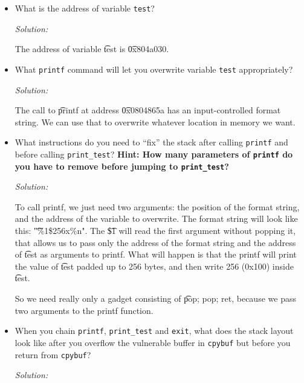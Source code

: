 \documentclass[a4paper,11pt]{article}
\newenvironment{solution}%
{\par{\noindent\small\textit{Solution:}}\vspace{-1ex}\begin{framed}}%
{\end{framed}\par}
\begin{document}
\begin{itemize}
  \item What is the address of variable \texttt{test}?

  \ifsolution
  \begin{solution}
	  The address of variable \t{test} is \t{0x804a030}.
\end{solution}
  \fi

  \item What \texttt{printf} command will let you overwrite variable
  \texttt{test} appropriately?
  
  \ifsolution
  \begin{solution}
	  The call to \t{printf} at address \t{0x0804865a} has an input-controlled format string.
	  We can use that to overwrite whatever location in memory we want.
\end{solution}
  \fi

  \item What instructions do you need to ``fix'' the stack after calling
  \texttt{printf} and before calling \texttt{print\_test}? \textbf{Hint: How
  many parameters of \texttt{printf} do you have to remove before jumping to
  \texttt{print\_test}?}
  
  \ifsolution
  \begin{solution}
	  To call printf, we just need two arguments: the position of the format string, and the address of the variable to overwrite.
	  The format string will look like this: \t{"\%1\$256x\%n"}. The \t{\$1} will read the first argument without popping it, that allows us to pass only the address of the format string and the address of \t{test} as arguments to printf. What will happen is that the printf will print the value of \t{test} padded up to 256 bytes, and then write 256 (0x100) inside \t{test}.

	  So we need really only a gadget consisting of \t{pop; pop; ret}, because we pass two arguments to the printf function.
\end{solution}
  \fi

  \item When you chain \texttt{printf}, \texttt{print\_test} and \texttt{exit},
  what does the stack layout look like after you overflow the vulnerable buffer
  in \texttt{cpybuf} but before you return from \texttt{cpybuf}?

  \ifsolution
  \begin{solution}


\end{solution}
\end{itemize}
\end{document}
